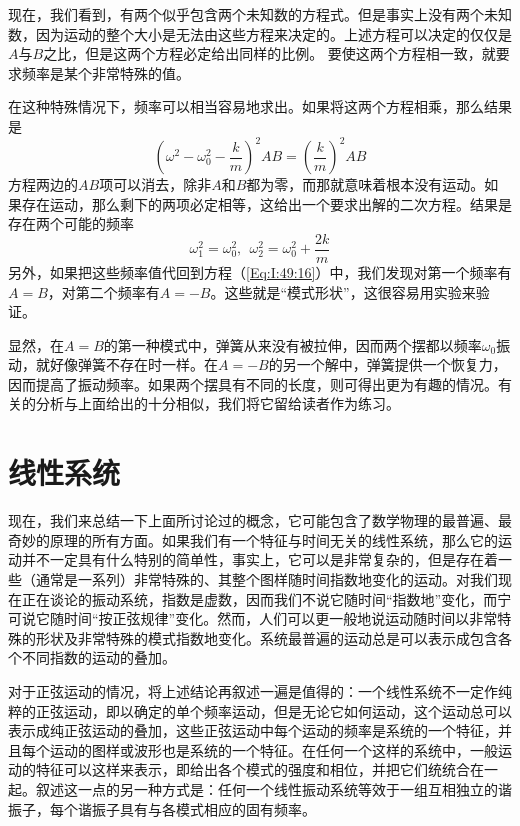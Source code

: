 现在，我们看到，有两个似乎包含两个未知数的方程式。但是事实上没有两个未知数，因为运动的整个大小是无法由这些方程来决定的。上述方程可以决定的仅仅是$A$与$B$之比，但是这两个方程必定给出同样的比例。 要使这两个方程相一致，就要求频率是某个非常特殊的值。

在这种特殊情况下，频率可以相当容易地求出。如果将这两个方程相乘，那么结果是
\begin{equation}
    \label{Eq:I:49:17}
    \left(\omega^2 - \omega_0^2 - \frac{k}{m}\right)^2AB = \left(\frac{k}{m}\right)^2AB 
\end{equation}
方程两边的$AB$项可以消去，除非$A$和$B$都为零，而那就意味着根本没有运动。如果存在运动，那么剩下的两项必定相等，这给出一个要求出解的二次方程。结果是存在两个可能的频率
\begin{equation}
    \label{Eq:I:49:18}
    \omega_1^2 = \omega_0^2,~~\omega_2^2 = \omega_0^2 + \frac{2k}{m}
\end{equation}
另外，如果把这些频率值代回到方程（\ref{Eq:I:49:16}）中，我们发现对第一个频率有$A=B$，对第二个频率有$A=-B$。这些就是“模式形状”，这很容易用实验来验证。

显然，在$A=B$的第一种模式中，弹簧从来没有被拉伸，因而两个摆都以频率$\omega_0$振动，就好像弹簧不存在时一样。在$A=-B$的另一个解中，弹簧提供一个恢复力，因而提高了振动频率。如果两个摆具有不同的长度，则可得出更为有趣的情况。有关的分析与上面给出的十分相似，我们将它留给读者作为练习。

\section{线性系统}

现在，我们来总结一下上面所讨论过的概念，它可能包含了数学物理的最普遍、最奇妙的原理的所有方面。如果我们有一个特征与时间无关的线性系统，那么它的运动并不一定具有什么特别的简单性，事实上，它可以是非常复杂的，但是存在着一些（通常是一系列）非常特殊的、其整个图样随时间指数地变化的运动。对我们现在正在谈论的振动系统，指数是虚数，因而我们不说它随时间“指数地”变化，而宁可说它随时间“按正弦规律”变化。然而，人们可以更一般地说运动随时间以非常特殊的形状及非常特殊的模式指数地变化。系统最普遍的运动总是可以表示成包含各个不同指数的运动的叠加。

对于正弦运动的情况，将上述结论再叙述一遍是值得的：一个线性系统不一定作纯粹的正弦运动，即以确定的单个频率运动，但是无论它如何运动，这个运动总可以表示成纯正弦运动的叠加，这些正弦运动中每个运动的频率是系统的一个特征，并且每个运动的图样或波形也是系统的一个特征。在任何一个这样的系统中，一般运动的特征可以这样来表示，即给出各个模式的强度和相位，并把它们统统合在一起。叙述这一点的另一种方式是：任何一个线性振动系统等效于一组互相独立的谐振子，每个谐振子具有与各模式相应的固有频率。

